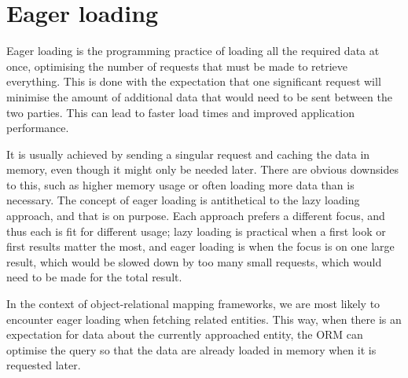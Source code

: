 \section{Eager loading}
Eager loading is the programming practice of loading all the required data at once, optimising the number of requests that must be made to retrieve everything. This is done with the expectation that one significant request will minimise the amount of additional data that would need to be sent between the two parties. This can lead to faster load times and improved application performance.\par
It is usually achieved by sending a singular request and caching the data in memory, even though it might only be needed later. There are obvious downsides to this, such as higher memory usage or often loading more data than is necessary. The concept of eager loading is antithetical to the lazy loading approach, and that is on purpose. Each approach prefers a different focus, and thus each is fit for different usage; lazy loading is practical when a first look or first results matter the most, and eager loading is when the focus is on one large result, which would be slowed down by too many small requests, which would need to be made for the total result.\par
In the context of object-relational mapping frameworks, we are most likely to encounter eager loading when fetching related entities. This way, when there is an expectation for data about the currently approached entity, the ORM can optimise the query so that the data are already loaded in memory when it is requested later.\par

